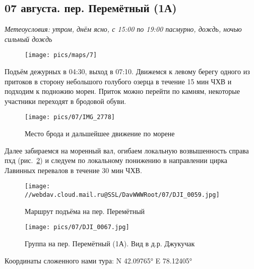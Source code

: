 \subsection{07 августа. пер. Перемётный (1А)}
\textit{Метеоусловия: утром, днём ясно, с 15:00 по 19:00 пасмурно, дождь, ночью сильный дождь}

\begin{figure}[h!]
	\centering
	\texttt{[image: pics/maps/7]}
	\label{fig:mini_18}
\end{figure}

Подъём дежурных в 04:30, выход в 07:10. Движемся к левому берегу одного из притоков в сторону небольшого голубого озерца в течение 15 мин ЧХВ и подходим к подножию морен. Приток можно перейти по камням, некоторые участники переходят в бродовой обуви.

\begin{figure}[h!]
	\centering
	\texttt{[image: pics/07/IMG\_2778]}
	\caption{Место брода и дальшейшее движение по морене}
	\label{fig:img2778}
\end{figure}

Далее забираемся на моренный вал, огибаем локальную возвышенность справа пхд (рис.~\ref{fig:img2778}) и следуем по локальному понижению в направлении цирка Лавинных перевалов в течение 30 мин ЧХВ.
\begin{figure}[h!]
	\centering
	\texttt{[image: //webdav.cloud.mail.ru@SSL/DavWWWRoot/07/DJI\_0059.jpg]}
	\caption{Маршрут подъёма на пер. Перемётный}
	\label{fig:DJI_0059.jpg}
\end{figure}

\begin{figure}[h!]
	\centering
	\texttt{[image: pics/07/DJI\_0067.jpg]}
	\caption{Группа на пер. Перемётный (1А). Вид в д.р. Джукучак}
	\label{fig:DJI_0067.jpg}
\end{figure}

Координаты сложенного нами тура: N 42.09765° E 78.12405°

\clearpage